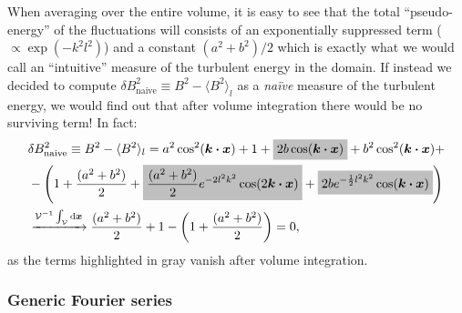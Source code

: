 \documentclass[]{article}
\newcommand{\mathcolorbox}[2]{\colorbox{#1}{$\displaystyle #2$}}
\newcommand{\bcdot}{\bm{\cdot}}
\begin{document}
%
When averaging over the entire volume, it is easy to see that the total ``pseudo-energy'' of the fluctuations will consists of an exponentially suppressed term ($\propto \exp(-k^2 l ^2)$) and a constant $(a^2 + b^2)/2$ which is exactly what we would call an ``intuitive'' measure of the turbulent energy in the domain.
If instead we decided to compute $\delta B^2_{\text{naive}} \equiv B^2 - \langle B^2 \rangle_l$ as a \textit{na\"{i}ve} measure of the turbulent energy, we would find out that after volume integration there would be no surviving term! In fact:
%
\begin{align}
	&\delta B^2_{\text{naive}} \equiv B^2 - \langle B^2 \rangle_l = a^2 \cos^2 (\bm k \bcdot\bm x) + 1 + \mathcolorbox{lgray}{2b \cos (\bm k \bcdot\bm x)} + b^2 \cos^2 (\bm k \bcdot\bm x) + \nonumber \\ 
	&- \left( 1 + \frac{(a^2 + b^2)}{2} + \mathcolorbox{lgray}{\frac{(a^2 + b^2)}{2} e^{-2 l^2 k^2} \cos (2 \bm k \bcdot\bm x)} + \mathcolorbox{lgray}{2b e^{-\frac{1}{2} l^2 k^2} \cos (\bm k \bcdot\bm x)} \right)  \nonumber \\
	&\xrightarrow{\mathcal{V}^{-1}\int_\mathcal{V} \mathrm{d} \bm x} \frac{(a^2 + b^2)}{2} + 1 - \left( 1 + \frac{(a^2 + b^2)}{2} \right) = 0,
\end{align}
%
as the terms highlighted in gray vanish after volume integration.

\subsubsection{Generic Fourier series}
\end{document}
